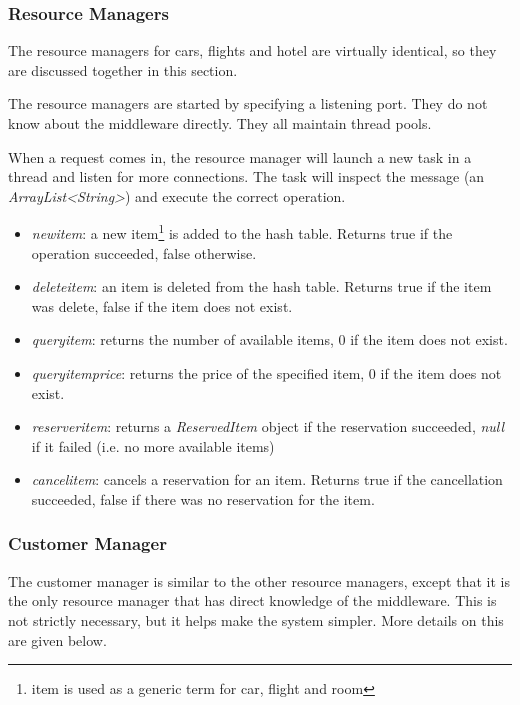 \documentclass[11pt]{article}
\begin{document}
\subsubsection{Resource Managers}

The resource managers for cars, flights and hotel are virtually
identical, so they are discussed together in this section.

The resource managers are started by specifying a listening port.
They do not know about the middleware directly.  They all maintain
thread pools.

When a request comes in, the resource manager will launch a new task
in a thread and listen for more connections.  The task will inspect
the message (an {\it ArrayList<String>}) and execute the correct
operation.


\begin{itemize}
\item {\it newitem}: a new item\footnote{item is used as a generic
    term for car, flight and room} is added to the hash table.
  Returns true if the operation succeeded, false otherwise.
\item {\it deleteitem}: an item is deleted from the hash table.
  Returns true if the item was delete, false if the item does not exist.
\item {\it queryitem}: returns the number of available items, 0 if the
  item does not exist.
\item {\it queryitemprice}: returns the price of the specified item, 0
  if the item does not exist.
\item {\it reserveritem}: returns a {\it ReservedItem} object if the
  reservation succeeded, {\it null} if it failed (i.e. no more
  available items)
\item {\it cancelitem}: cancels a reservation for an item.  Returns
  true if the cancellation succeeded, false if there was no
  reservation for the item.
\end{itemize}


\subsubsection{Customer Manager}

The customer manager is similar to the other resource managers, except
that it is the only resource manager that has direct knowledge of the
middleware.  This is not strictly necessary, but it helps make the
system simpler.  More details on this are given below.
\end{document}
